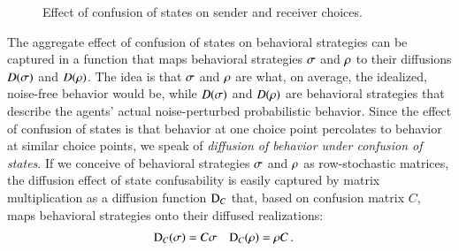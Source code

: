 \begin{figure}

  \caption{Effect of confusion of states on sender and receiver
    choices.}
  \label{fig:noise-perturbation-of-strategies}
\end{figure}

The aggregate effect of confusion of states on behavioral strategies
can be captured in a function that maps behavioral strategies
$\sigma$ and $\rho$ to their diffusions $D(\sigma)$ and
$D(\rho)$. The idea is that $\sigma$ and $\rho$ are what, on
average, the idealized, noise-free behavior would be, while
$D(\sigma)$ and $D(\rho)$ are behavioral strategies that describe
the agents' actual noise-perturbed probabilistic behavior. Since the
effect of confusion of states is that behavior at one choice point
percolates to behavior at similar choice points, we speak of
\emph{diffusion of behavior under confusion of states}. If we
conceive of behavioral strategies $\sigma$ and $\rho$ as
row-stochastic matrices, the diffusion effect of state confusability
is easily captured by matrix multiplication as a diffusion function
$\mathrm{D}_C$ that, based on confusion matrix $C$, maps behavioral
strategies onto their diffused realizations:
\begin{align}
  \label{eq:confusion-function}
  \mathrm{D}_C(\sigma) & = C \sigma &    \mathrm{D}_C(\rho) & = \rho C\,.
\end{align}



